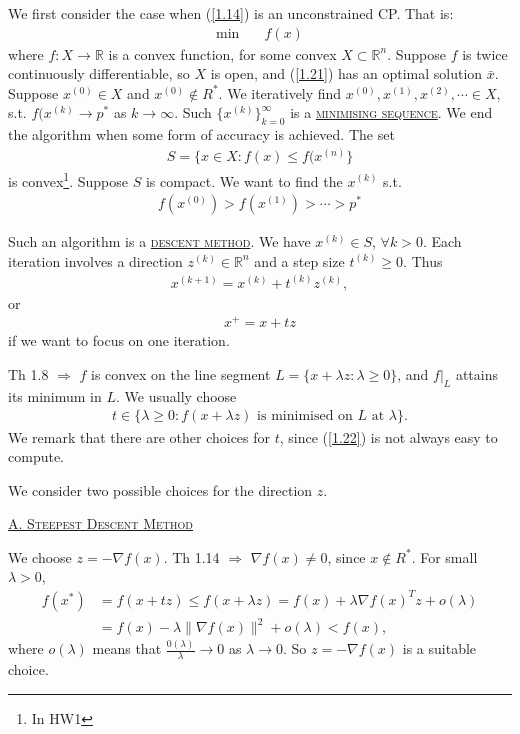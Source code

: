 We first consider the case when (\ref{1.14}) is an unconstrained CP. That is:
\begin{align}
    \min &\quad f(x) \label{1.21} 
\end{align}
where $f: X\to\mathbb{R}$ is a convex function, for some convex $X\subset \mathbb{R}^n$. Suppose $f$ is twice continuously differentiable, so $X$ is open, and (\ref{1.21}) has an optimal solution $\bar{x}$. Suppose $x^{(0)}\in X$ and $x^{(0)}\notin R^*$. We iteratively find $x^{(0)}, x^{(1)}, x^{(2)}, \cdots\in X$, s.t. $f(x^{(k)}\to p^*$ as $k\to\infty$. Such $\{x^{(k)}\}_{k=0}^{\infty}$ is a \underline{\textcolor{MarkerColour}{\textsc{minimising sequence}}}. We end the algorithm when some form of accuracy is achieved. The set
\begin{align*}
    S = \{x\in X: f(x) \le f(x^{(n)} \}
\end{align*}
is convex\footnote{In HW1}. Suppose $S$ is compact. We want to find the $x^{(k)}$ s.t.
\begin{align*}
    f(x^{(0)}) > f(x^{(1)}) > \cdots > p^*
\end{align*}

Such an algorithm is a \underline{\textcolor{MarkerColour}{\textsc{descent method}}}. We have $x^{(k)}\in S$, $\forall k>0$. Each iteration involves a direction $z^{(k)}\in \mathbb{R}^n$ and a step size $t^{(k)}\ge 0$. Thus
\begin{align*}
    x^{(k+1)} = x^{(k)} + t^{(k)}z^{(k)},
\end{align*}
or
\begin{align*}
    x^+ = x + tz
\end{align*}
if we want to focus on one iteration.

Th 1.8 $\Rightarrow$ $f$ is convex on the line segment $L = \{x+\lambda z:\lambda\ge 0 \}$, and $f\bigg|_L$ attains its minimum in $L$. We usually choose 
\begin{align}
    t \in \{\lambda\ge 0: f(x+\lambda z)\text{ is minimised on $L$ at $\lambda$} \}.\label{1.22}
\end{align}
We remark that there are other choices for $t$, since (\ref{1.22}) is not always easy to compute.

We consider two possible choices for the direction $z$.

\noindent\underline{\textcolor{MarkerColour}{\textsc{A. Steepest Descent Method}}}

We choose $z = -\nabla f(x)$. Th 1.14 $\Rightarrow$ $\nabla f(x)\neq 0$, since $x\notin R^*$. For small $\lambda>0$, 
\begin{align*}
    f(x^*) &= f(x+tz) \le f(x+\lambda z) = f(x) + \lambda \nabla f(x)^T z + o(\lambda) \\
    &= f(x) - \lambda \|\nabla f(x)\|^2 + o(\lambda) < f(x),
\end{align*}
where $o(\lambda)$ means that $\frac{0(\lambda)}{\lambda}\to 0$ as $\lambda\to 0$. So $z = -\nabla f(x)$ is a suitable choice.

